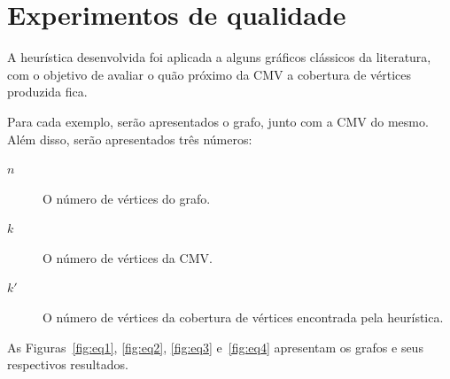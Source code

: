 \section{Experimentos de qualidade}
\label{sec:experimentos-qualidade}
A heurística desenvolvida foi aplicada a alguns gráficos clássicos da
literatura, com o objetivo de avaliar o quão próximo da CMV a
cobertura de vértices produzida fica.

Para cada exemplo, serão apresentados o grafo, junto com a
CMV do mesmo. Além disso, serão apresentados três números:
\begin{description}
    \item[$n$] O número de vértices do grafo.
    \item[$k$] O número de vértices da CMV.
    \item[$k'$] O número de vértices da cobertura de vértices
    encontrada pela heurística.
\end{description}

As Figuras~\ref{fig:eq1}, \ref{fig:eq2}, \ref{fig:eq3} e~\ref{fig:eq4}
apresentam os grafos e seus respectivos resultados.

